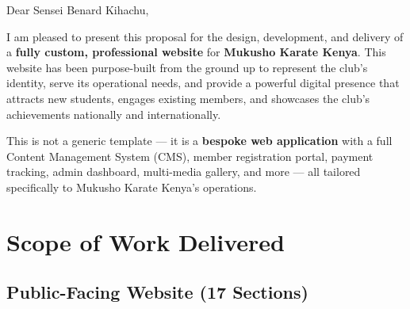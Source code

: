 \documentclass[12pt,a4paper]{article}
\begin{document}
Dear Sensei Benard Kihachu,

I am pleased to present this proposal for the design, development, and delivery of a \textbf{fully custom, professional website} for \textbf{Mukusho Karate Kenya}. This website has been purpose-built from the ground up to represent the club's identity, serve its operational needs, and provide a powerful digital presence that attracts new students, engages existing members, and showcases the club's achievements nationally and internationally.

This is not a generic template --- it is a \textbf{bespoke web application} with a full Content Management System (CMS), member registration portal, payment tracking, admin dashboard, multi-media gallery, and more --- all tailored specifically to Mukusho Karate Kenya's operations.

\section{Scope of Work Delivered}

\subsection{Public-Facing Website (17 Sections)}
\end{document}
